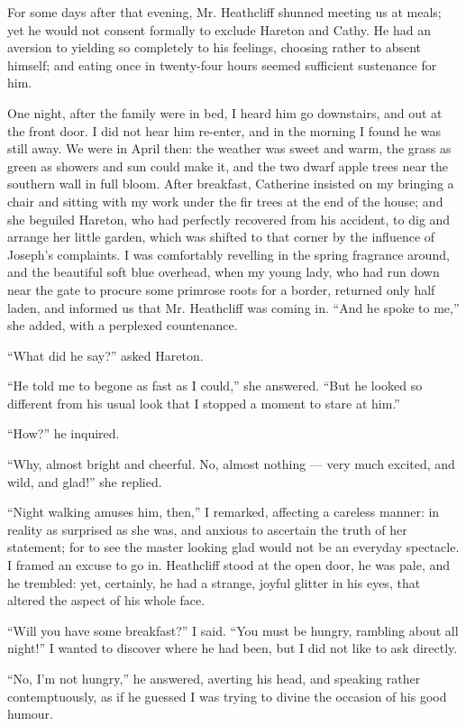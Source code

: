 \par For some days after that evening, Mr. Heathcliff shunned meeting us at meals; yet he would not consent formally to exclude Hareton and Cathy. He had an aversion to yielding so completely to his feelings, choosing rather to absent himself; and eating once in twenty-four hours seemed sufficient sustenance for him.
\par One night, after the family were in bed, I heard him go downstairs, and out at the front door. I did not hear him re-enter, and in the morning I found he was still away. We were in April then: the weather was sweet and warm, the grass as green as showers and sun could make it, and the two dwarf apple trees near the southern wall in full bloom. After breakfast, Catherine insisted on my bringing a chair and sitting with my work under the fir trees at the end of the house; and she beguiled Hareton, who had perfectly recovered from his accident, to dig and arrange her little garden, which was shifted to that corner by the influence of Joseph's complaints. I was comfortably revelling in the spring fragrance around, and the beautiful soft blue overhead, when my young lady, who had run down near the gate to procure some primrose roots for a border, returned only half laden, and informed us that Mr. Heathcliff was coming in. “And he spoke to me,” she added, with a perplexed countenance.
\par “What did he say?” asked Hareton.
\par “He told me to begone as fast as I could,” she answered. “But he looked so different from his usual look that I stopped a moment to stare at him.”
\par “How?” he inquired.
\par “Why, almost bright and cheerful. No, almost nothing — very much excited, and wild, and glad!” she replied.
\par “Night walking amuses him, then,” I remarked, affecting a careless manner: in reality as surprised as she was, and anxious to ascertain the truth of her statement; for to see the master looking glad would not be an everyday spectacle. I framed an excuse to go in. Heathcliff stood at the open door, he was pale, and he trembled: yet, certainly, he had a strange, joyful glitter in his eyes, that altered the aspect of his whole face.
\par “Will you have some breakfast?” I said. “You must be hungry, rambling about all night!” I wanted to discover where he had been, but I did not like to ask directly.
\par “No, I'm not hungry,” he answered, averting his head, and speaking rather contemptuously, as if he guessed I was trying to divine the occasion of his good humour.
